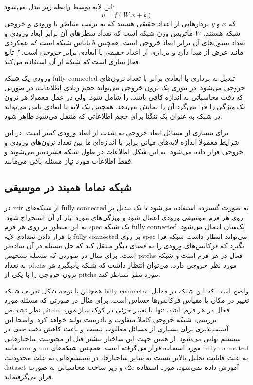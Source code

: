 این لایه توسط رابطه زیر مدل می‌شود:
\begin{equation}
    y = f(W.x + b)
\end{equation}
که $x$ و $y$ بردارهایی از اعداد حقیقی هستند که به ترتیب متناظر با ورودی و خروجی
شبکه هستند. $W$ ماتریس وزن شبکه است که تعداد سطرهای آن برابر ابعاد ورودی و تعداد
ستون‌های آن برابر ابعاد خروجی است. همچنین $b$ بایاس شبکه است که عمکردی مانند عرض
از مبدا دارد و برداری از اعداد حقیقی با ابعادی برابر خروجی است. $f$ تابع
فعال‌سازی است که شبکه از آن استفاده می‌کند.

ورودی یک شبکه \gls{fully connected} تبدیل به برداری با ابعادی برابر با تعداد
نرون‌های خروجی می‌شود. در تئوری یک نرون خروجی می‌تواند حجم زیادی اطلاعات، در
صورتی که دقت محاسباتی به اندازه کافی باشد، را شامل شود. ولی در عمل معمولا هر
نرون یک ویژگی را فرا می‌گرد آن را نمایش می‌دهد. همچنین یک لایه با ابعادی پایین
می‌تواند در شبکه به عنوان یک تنگنا برای حجم اطلاعاتی که منتقل می‌شود ظاهر شود.

برای بسیاری از مسائل ابعاد خروجی به شدت از ابعاد ورودی کمتر است. در این شرایط
معمولا اندازه لایه‌های میانی برابر با اندازه‌ای ما بین تعداد نرون‌های ورودی و
خروجی قرار داده می‌شود. به این شکل اطلاعات در طول شبکه فشرده‌تر می‌شوند و فقط
اطلاعات مورد نیاز مسئله باقی می‌مانند.

\subsection{شبکه تماما همبند در موسیقی}
در \gls{mir} از شبکه‌های \gls{fully connected} به صورت گسترده استفاده می‌شود تا
یک تبدیل بر روی هر فرم موسیقی ورودی اعمال شود و ویژگی‌های مورد نیاز از آن
استخراج شود. به این منظور بر روی هر فرم \gls{spec} یک شبکه \gls{fully connected}
یک‌سان اعمال می‌شود. با قرار دادن تعدادی لایه \gls{fully connected} بر روی
\gls{spec} می‌تواند انتظار داشت شبکه فرا بگیرد که فرکانس‌های ورودی را به فضای
دیگر منتقل کند که حل مسئله در آن ساده‌تر است. برای مثال در صورتی که مسئله تشخیص
\glspl{pitch} فعال در هر فرم است و شبکه به تعداد \glspl{pitch} مورد نظر خروجی
دارد، می‌توان انتظار داشت که شبکه یادبگیرد هر نرون خروجی را با یکی از
\glspl{pitch} مورد نظر متناظر کند.

همچنین با توجه شکل تعریف شبکه \gls{fully connected} واضح است که این شبکه در
مقابل تغییر در مکان یا مقیاس فرکانس‌ها حساس است. برای مثال در صورتی که مسئله
مورد نظر تشخیص \glspl{pitch} فعال در هر فرم باشد، تنها با تغییر جزئی در کوک ساز
مورد بررسی، شبکه خروجی کاملا متفاوت و نادرست تولید خواهد کرد. واضحا این
آسیب‌پذیری برای بسیاری از مسائل مطلوب نیست و باعث کاهش دقت جدی در سیستم نهایی
می‌شود. از همین جهت این ساختار بیشتر قبل از محبوبیت ساختارهایی مانند \gls{cnn} و
\gls{rnn} مورد استفاده قرار می‌گرفته است. همچنین شبکه‌های \gls{fully connected}
به علت قابلیت تحلیل بالاتر نسبت به سایر ساختارها، در سیستم‌هایی به علت محدودیت
\gls{dataset} و زیر ساخت محاسباتی به صورت \gls{e2e} آموزش داده نمی‌شود، مورد
استفاده قرار می‌گرفته‌اند.

